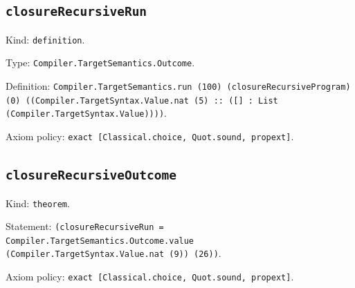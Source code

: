 \documentclass[11pt]{article}
\begin{document}
\subsection*{\texttt{closureRecursiveRun}}
\noindent Kind: \texttt{definition}.\par
\noindent Type: \texttt{Compiler.TargetSemantics.Outcome}.\par
\noindent Definition: \texttt{Compiler.TargetSemantics.run (100) (closureRecursiveProgram) (0) ((Compiler.TargetSyntax.Value.nat (5) :: ([] : List (Compiler.TargetSyntax.Value))))}.\par
\noindent Axiom policy: \texttt{exact [Classical.choice, Quot.sound, propext]}.\par
\subsection*{\texttt{closureRecursiveOutcome}}
\noindent Kind: \texttt{theorem}.\par
\noindent Statement: \texttt{(closureRecursiveRun = Compiler.TargetSemantics.Outcome.value (Compiler.TargetSyntax.Value.nat (9)) (26))}.\par
\noindent Axiom policy: \texttt{exact [Classical.choice, Quot.sound, propext]}.\par
\end{document}
